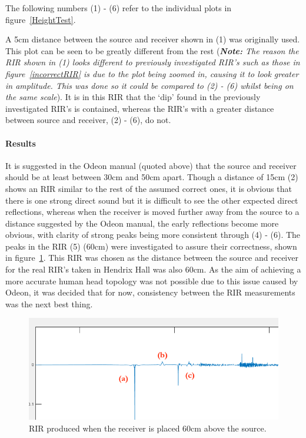 \documentclass[../../main.tex]{subfiles}
\begin{document}
			The following numbers (1) - (6) refer to the individual plots in figure~\ref{HeightTest}.

			A 5cm distance between the source and receiver shown in (1) was originally used. This plot can be seen to be greatly different from the rest (\textit{\textbf{Note:} The reason the \ac{RIR} shown in (1) looks different to previously investigated \ac{RIR}'s such as those in figure~\ref{incorrectRIR} is due to the plot being zoomed in, causing it to look greater in amplitude. This was done so it could be compared to (2) - (6) whilst being on the same scale}). It is in this \ac{RIR} that the `dip' found in the previously investigated \ac{RIR}'s is contained, whereas the \ac{RIR}'s with a greater distance between source and receiver, (2) - (6), do not.

			\paragraph{Results}
			\label{odeon:results}

			It is suggested in the Odeon manual (quoted above) that the source and receiver should be at least between 30cm and 50cm apart. Though a distance of 15cm (2) shows an \ac{RIR} similar to the rest of the assumed correct ones, it is obvious that there is one strong direct sound but it is difficult to see the other expected direct reflections, whereas when the receiver is moved further away from the source to a distance suggested by the Odeon manual, the early reflections become more obvious, with clarity of strong peaks being more consistent through (4) - (6). The peaks in the \ac{RIR} (5) (60cm) were investigated to assure their correctness, shown in figure~\ref{60cm}. This \ac{RIR} was chosen as the distance between the source and receiver for the real \ac{RIR}’s taken in Hendrix Hall was also 60cm. As the aim of achieving a more accurate human head topology was not possible due to this issue caused by Odeon, it was decided that for now, consistency between the \ac{RIR} measurements was the next best thing.


			\begin{figure}[h]
				\centerline{\includegraphics[width=\textwidth]{Sections/Implementation/Odeon/images/incorrectRIR/76_60cm_editV2_crop.png}}
				\caption{\ac{RIR} produced when the receiver is placed 60cm above the source.}
				\label{60cm}
			\end{figure}
\end{document}
